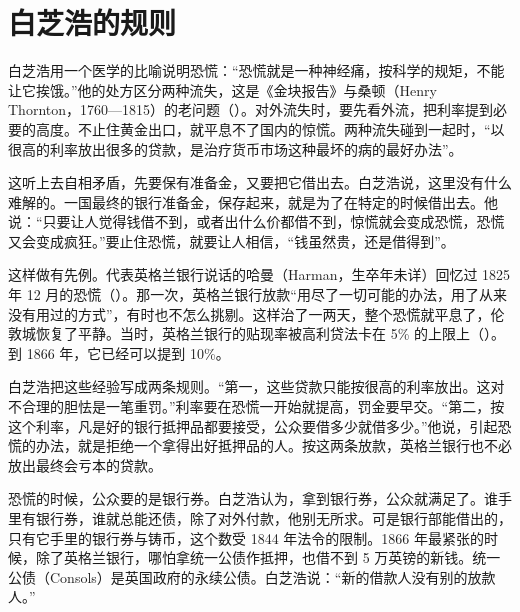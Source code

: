 \section{白芝浩的规则}\label{sec:gold-bagehot}

白芝浩用一个医学的比喻说明恐慌：“恐慌就是一种神经痛，按科学的规矩，不能让它挨饿。”\cite{bagehot1873}他的处方区分两种流失，这是《金块报告》与桑顿（Henry Thornton，1760—1815）的老问题（）。对外流失时，要先看外流，把利率提到必要的高度。不止住黄金出口，就平息不了国内的惊慌\cite{bagehot1873}。两种流失碰到一起时，“以很高的利率放出很多的贷款，是治疗货币市场这种最坏的病的最好办法”\cite{bagehot1873}。

这听上去自相矛盾，先要保有准备金，又要把它借出去。白芝浩说，这里没有什么难解的。一国最终的银行准备金，保存起来，就是为了在特定的时候借出去\cite{bagehot1873}。他说：“只要让人觉得钱借不到，或者出什么价都借不到，惊慌就会变成恐慌，恐慌又会变成疯狂。”\cite{bagehot1873}要止住恐慌，就要让人相信，“钱虽然贵，还是借得到”\cite{bagehot1873}。

这样做有先例。代表英格兰银行说话的哈曼（Harman，生卒年未详）回忆过 1825 年 12 月的恐慌（）。那一次，英格兰银行放款“用尽了一切可能的办法，用了从来没有用过的方式”，有时也不怎么挑剔\cite{bagehot1873}。这样治了一两天，整个恐慌就平息了，伦敦城恢复了平静\cite{bagehot1873}。当时，英格兰银行的贴现率被高利贷法卡在 5\% 的上限上（）。到 1866 年，它已经可以提到 10\%\cite{boe2017}。

白芝浩把这些经验写成两条规则。“第一，这些贷款只能按很高的利率放出。这对不合理的胆怯是一笔重罚。”\cite{bagehot1873}利率要在恐慌一开始就提高，罚金要早交\cite{bagehot1873}。“第二，按这个利率，凡是好的银行抵押品都要接受，公众要借多少就借多少。”\cite{bagehot1873}他说，引起恐慌的办法，就是拒绝一个拿得出好抵押品的人。按这两条放款，英格兰银行也不必放出最终会亏本的贷款\cite{bagehot1873}。

恐慌的时候，公众要的是银行券。白芝浩认为，拿到银行券，公众就满足了。谁手里有银行券，谁就总能还债，除了对外付款，他别无所求\cite{bagehot1873}。可是银行部能借出的，只有它手里的银行券与铸币，这个数受 1844 年法令的限制\cite{bagehot1873}。1866 年最紧张的时候，除了英格兰银行，哪怕拿统一公债作抵押，也借不到 5 万英镑的新钱\cite{bagehot1873}。统一公债（Consols）是英国政府的永续公债。白芝浩说：“新的借款人没有别的放款人。”\cite{bagehot1873}

